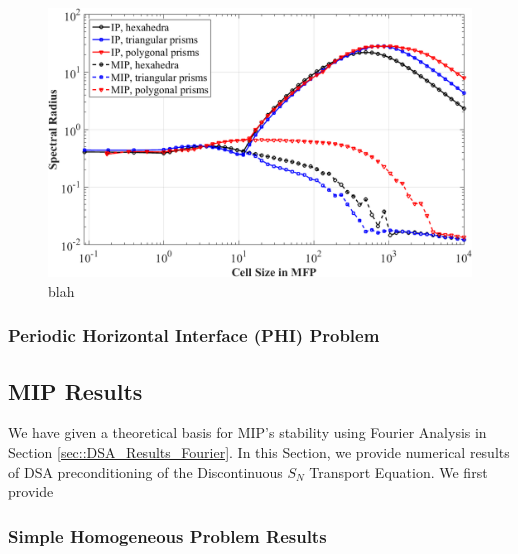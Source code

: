 \begin{figure}
\centering
\includegraphics[width=\textwidth]{figures/sec_DSA/IP,MIP_V_hex,tri,poly_LS8_C=4.png}
\caption{blah}
\label{fig::IP_MIP_Homo_LS8_C4}
\end{figure}

\subsubsection{Periodic Horizontal Interface (PHI) Problem}
\label{sec::DSA_Results_Fourier_PHI}


\subsection{MIP Results}
\label{sec::DSA_Results_MIP}

We have given a theoretical basis for MIP's stability using Fourier Analysis in Section \ref{sec::DSA_Results_Fourier}. In this Section, we provide numerical results of DSA preconditioning of the Discontinuous $S_N$ Transport Equation. We first provide 

\subsubsection{Simple Homogeneous Problem Results}
\label{sec::DSA_Results_MIP_Homo}

